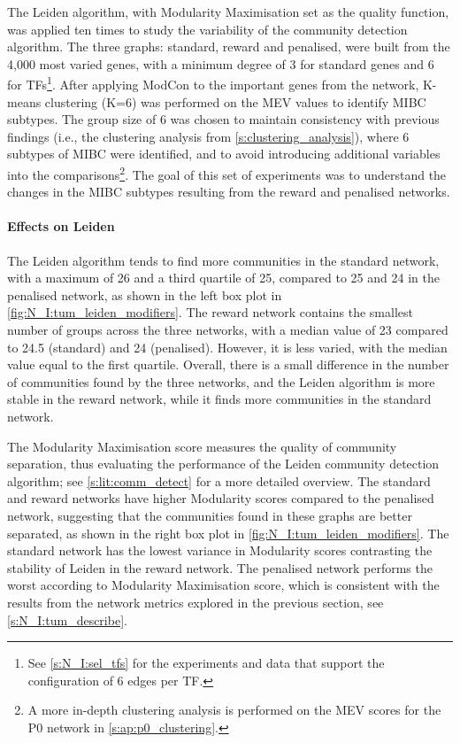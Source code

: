 The Leiden algorithm, with Modularity Maximisation set as the quality function, was applied ten times to study the variability of the community detection algorithm. The three graphs: standard, reward and penalised, were built from the 4,000 most varied genes, with a minimum degree of 3 for standard genes and 6 for TFs\footnote{See \cref{s:N_I:sel_tfs} for the experiments and data that support the configuration of 6 edges per TF.}. After applying ModCon to the important genes from the network, K-means clustering (K=6) was performed on the MEV values to identify MIBC subtypes. The group size of 6 was chosen to maintain consistency with previous findings (i.e., the clustering analysis from \cref{s:clustering_analysis}), where 6 subtypes of MIBC were identified, and to avoid introducing additional variables into the comparisons\footnote{A more in-depth clustering analysis is performed on the MEV scores for the P0 network in \cref{s:ap:p0_clustering}.}. The goal of this set of experiments was to understand the changes in the MIBC subtypes resulting from the reward and penalised networks.


\paragraph*{Effects on Leiden}
The Leiden algorithm tends to find more communities in the standard network, with a maximum of 26 and a third quartile of 25, compared to 25 and 24 in the penalised network, as shown in the left box plot in \cref{fig:N_I:tum_leiden_modifiers}. The reward network contains the smallest number of groups across the three networks, with a median value of 23 compared to 24.5 (standard) and 24 (penalised). However, it is less varied, with the median value equal to the first quartile. Overall, there is a small difference in the number of communities found by the three networks, and the Leiden algorithm is more stable in the reward network, while it finds more communities in the standard network.

The Modularity Maximisation score measures the quality of community separation, thus evaluating the performance of the Leiden community detection algorithm; see \cref{s:lit:comm_detect} for a more detailed overview. The standard and reward networks have higher Modularity scores compared to the penalised network, suggesting that the communities found in these graphs are better separated, as shown in the right box plot in \cref{fig:N_I:tum_leiden_modifiers}. The standard network has the lowest variance in Modularity scores contrasting the stability of Leiden in the reward network. The penalised network performs the worst according to Modularity Maximisation score, which is consistent with the results from the network metrics explored in the previous section, see \cref{s:N_I:tum_describe}.

